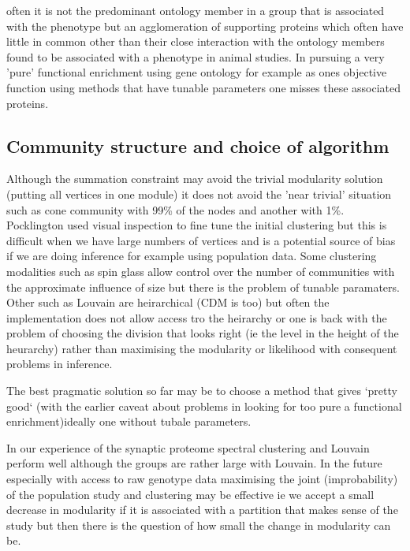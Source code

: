  often it is not the predominant ontology member in a group that is associated with the phenotype but an agglomeration of supporting proteins which often have little in common other than their close interaction with the ontology members found to be associated with a phenotype in animal studies. In pursuing a very 'pure' functional enrichment using gene ontology for example as ones objective function using methods that have tunable parameters one misses these associated proteins. 

\subsection{Community structure and choice of algorithm}

Although the summation constraint  may avoid the trivial modularity solution (putting all vertices in one module) it does not avoid the 'near trivial' situation such as cone community with 99\% of the nodes and another with 1\%. Pocklington used visual inspection to fine tune the initial clustering but this is difficult when we have large numbers of vertices and is a potential source of bias if we are doing inference for example using population data. Some clustering modalities such as spin glass allow control over the number of communities with the approximate influence of size but there is the problem of tunable paramaters. Other such as Louvain are heirarchical (CDM is too) but often the implementation does not allow access tro the heirarchy or one is back with the problem of choosing the division that looks right (ie the level in the height of the heurarchy) rather than maximising the modularity or likelihood with consequent problems in inference. 

The best pragmatic solution so far may be to choose a method that gives `pretty good` (with the earlier caveat about problems in looking for too pure a functional enrichment)ideally one without tubale parameters. 

In our experience of the synaptic proteome spectral clustering and Louvain perform well although the groups are rather large with Louvain. In the future especially with access to raw genotype data maximising the joint (improbability) of the population study and clustering may be effective ie we accept a small decrease in modularity if it is associated with a partition that makes sense of the study but then there is the question of how small the change in modularity can be. 



